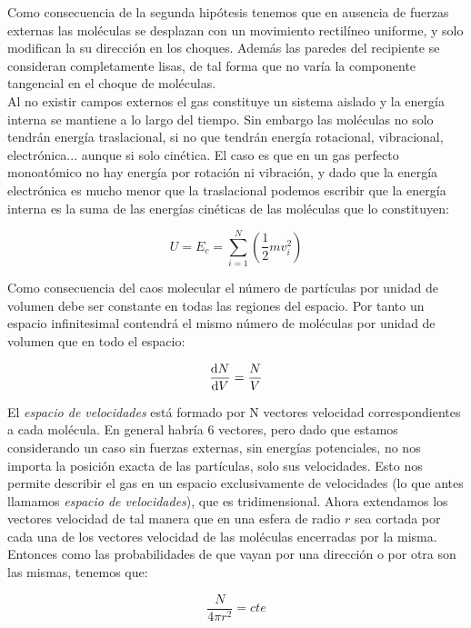 \documentclass[12pt,a4paper,oneside]{book}
\begin{document}
Como consecuencia de la segunda hipótesis tenemos que en ausencia de fuerzas externas las moléculas se desplazan con un movimiento rectilíneo uniforme, y solo modifican la su dirección en los choques. Además las paredes del recipiente se consideran completamente lisas, de tal forma que no varía la componente tangencial en el choque de moléculas. \\

Al no existir campos externos el gas constituye un sistema aislado y la energía interna se mantiene a lo largo del tiempo. Sin embargo las moléculas no solo tendrán energía traslacional, si no que tendrán energía rotacional, vibracional, electrónica... aunque si solo cinética. El caso es que en un gas perfecto monoatómico no hay energía por rotación ni vibración, y dado que la energía electrónica es mucho menor que la traslacional podemos escribir que la energía interna es la suma de las energías cinéticas de las moléculas que lo constituyen:

\begin{equation}
U = E_c = \sum_{i=1}^N \left( \dfrac{1}{2} m v_i^2 \right)
\end{equation}

Como consecuencia del caos molecular el número de partículas por unidad de volumen debe ser constante en todas las regiones del espacio. Por tanto un espacio infinitesimal contendrá el mismo número de moléculas por unidad de volumen que en todo el espacio:

\begin{equation}
\dfrac{\mathrm{d} N}{\mathrm{d} V} = \dfrac{N}{V}
\end{equation}

El \textit{espacio de velocidades} está formado por N vectores velocidad correspondientes a cada molécula. En general habría 6 vectores, pero dado que estamos considerando un caso sin fuerzas externas, sin energías potenciales, no nos importa la posición exacta de las partículas, solo sus velocidades. Esto nos permite describir el gas en un espacio exclusivamente de velocidades (lo que antes llamamos \textit{espacio de velocidades}), que es tridimensional. Ahora extendamos los vectores velocidad de tal manera que en una esfera de radio $r$ sea cortada por cada una de los vectores velocidad de las moléculas encerradas por la misma. Entonces como las probabilidades de que vayan por una dirección o por otra son las mismas, tenemos que:


\begin{equation}
\dfrac{N}{4 \pi r^2} = cte
\end{equation}
\end{document}
